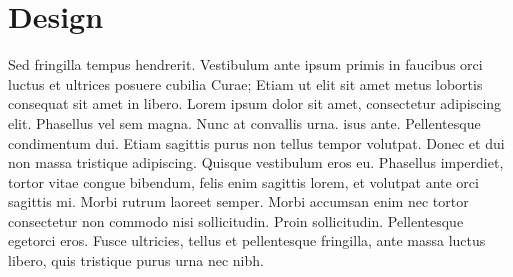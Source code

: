 \section*{Design}
{
\scalebox{1.5}{}
}

Sed fringilla tempus hendrerit. Vestibulum ante ipsum primis in faucibus orci
luctus et ultrices posuere cubilia Curae; Etiam ut elit sit amet metus lobortis
consequat sit amet in libero. Lorem ipsum dolor sit amet, consectetur
adipiscing elit. Phasellus vel sem magna. Nunc at convallis urna. isus ante.
Pellentesque condimentum dui. Etiam sagittis purus non tellus tempor volutpat. 
Donec et dui non massa tristique adipiscing. Quisque vestibulum eros eu.
Phasellus imperdiet, tortor vitae congue bibendum, felis enim sagittis lorem,
et volutpat ante orci sagittis mi. Morbi rutrum laoreet semper. Morbi accumsan 
enim nec tortor consectetur non commodo nisi sollicitudin. Proin sollicitudin. 
Pellentesque egetorci eros. Fusce ultricies, tellus et pellentesque fringilla, 
ante massa luctus libero, quis tristique purus urna nec nibh.

